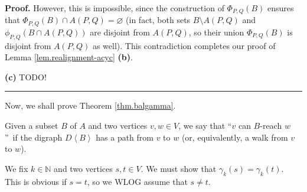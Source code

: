 \documentclass[numbers=enddot,12pt,final,onecolumn,notitlepage]{scrartcl}%
\theoremstyle{definition}
\newenvironment{proof}[1][Proof]{\noindent\textbf{#1.} }{\ \rule{0.5em}{0.5em}}
\theoremstyle{plainsl}
\begin{document}
\begin{proof}
However, this is impossible, since the construction of $\Phi_{P,Q}\left(
B\right)  $ ensures that $\Phi_{P,Q}\left(  B\right)  \cap A\left(
P,Q\right)  =\varnothing$ (in fact, both sets $B\setminus A\left(  P,Q\right)
$ and $\phi_{P,Q}\left(  B\cap A\left(  P,Q\right)  \right)  $ are disjoint
from $A\left(  P,Q\right)  $, so their union $\Phi_{P,Q}\left(  B\right)  $ is
disjoint from $A\left(  P,Q\right)  $ as well). This contradiction completes
our proof of Lemma \ref{lem.realignment-acyc} \textbf{(b)}. \medskip

\textbf{(c)} TODO!
\end{proof}

Now, we shall prove Theorem \ref{thm.balgamma}.

Given a subset $B$ of $A$ and two vertices $v,w\in V$, we say that
\textquotedblleft$v$ can $B$-reach $w$\textquotedblright\ if the digraph
$D\left\langle B\right\rangle $ has a path from $v$ to $w$ (or, equivalently,
a walk from $v$ to $w$).

We fix $k\in\mathbb{N}$ and two vertices $s,t\in V$. We must show that
$\gamma_{k}\left(  s\right)  =\gamma_{k}\left(  t\right)  $. This is obvious
if $s=t$, so we WLOG assume that $s\neq t$.
\end{document}
